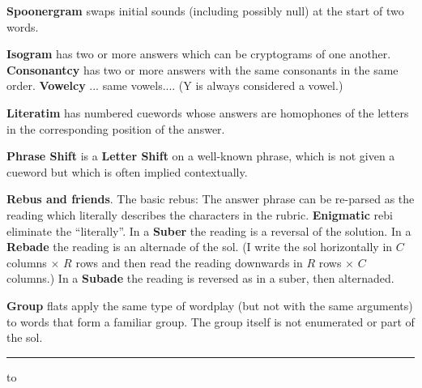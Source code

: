{\bf Spoonergram} swaps initial sounds (including possibly null) at
the start of two words.

{\bf Isogram} has two or more answers which can be cryptograms of one
another. {\bf Consonantcy} has two or more answers with the same
consonants in the same order. {\bf Vowelcy} ... same vowels.... (Y is
always considered a vowel.)

{\bf Literatim} has numbered cuewords whose answers are homophones of
the letters in the corresponding position of the answer.

{\bf Phrase Shift} is a {\bf Letter Shift} on a well-known phrase,
which is not given a cueword but which is often implied contextually.

{\bf Rebus and friends}. The basic rebus: The answer phrase can be
re-parsed as the reading which literally describes the characters in
the rubric. {\bf Enigmatic} rebi eliminate the ``literally''. In a
{\bf Suber} the reading is a reversal of the solution. In a {\bf
Rebade} the reading is an alternade of the sol. (I write the sol
horizontally in $C$ columns $\times$ $R$ rows and then read the
reading downwards in $R$ rows $\times$ $C$ columns.) In a {\bf Subade}
the reading is reversed as in a suber, then alternaded.

{\bf Group} flats apply the same type of wordplay (but not with the
same arguments) to words that form a familiar group. The group itself
is not enumerated or part of the sol.

\vskip 6pt
\hrule 
\vskip 4pt

\hbox to 

\bye
